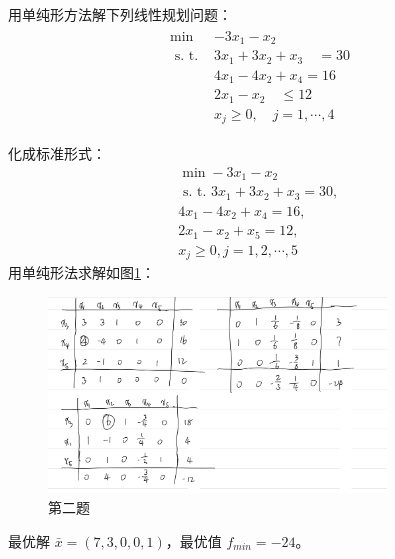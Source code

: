 \begin{problem}
    用单纯形方法解下列线性规划问题：
    \begin{align*}
        \begin{array}{ll}
            \min & -3 x_{1}-x_{2} \\
            \text { s. t. } & 3 x_{1}+3 x_{2}+x_{3} \quad=30 \\
            & 4 x_{1}-4 x_{2}+x_{4}=16 \\
            & 2 x_{1}-x_{2} \quad \leqslant 12 \\
            & x_{j} \geqslant 0, \quad j=1, \cdots, 4 
        \end{array}
    \end{align*}
\end{problem}
\begin{solution}
    化成标准形式：
    \[\begin{array}{l}
        \min -3 x_{1}-x_{2}\\
        \text { s. t. } 3 x_{1}+3 x_{2}+x_{3}=30 \text {, }\\
        4 x_{1}-4 x_{2}+x_{4}=16 \text {, }\\
        2 x_{1}-x_{2}+x_{5}=12 \text {, }\\
        x_{j} \geqslant 0, j=1,2, \cdots, 5
    \end{array}\]
    用单纯形法求解如图\ref{fig2}：
    \begin{figure}[htbp]
        \centering
        \includegraphics[width=0.8\textwidth]{./figures/img2.png}
        \caption{第二题 \label{fig2}}
    \end{figure}

    最优解 $\bar{x} = (7, 3, 0, 0, 1)$，最优值 $f_{min} = -24$。
\end{solution}

